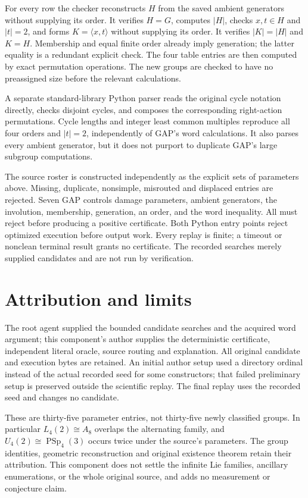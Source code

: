\documentclass[10pt,a4paper]{article}
\begin{document}
For every row the checker reconstructs $H$ from the saved ambient
generators without supplying its order. It verifies $H=G$, computes
$|H|$, checks $x,t\in H$ and $|t|=2$, and forms $K=\langle x,t\rangle$
without supplying its order. It verifies $|K|=|H|$ and $K=H$.
Membership and equal finite order already imply generation; the latter
equality is a redundant explicit check. The four table entries are then
computed by exact permutation operations. The new groups are checked to
have no preassigned size before the relevant calculations.

A separate standard-library Python parser reads the original cycle
notation directly, checks disjoint cycles, and composes the corresponding
right-action permutations. Cycle lengths and integer least common
multiples reproduce all four orders and $|t|=2$, independently of GAP's
word calculations. It also parses every ambient generator, but it does
not purport to duplicate GAP's large subgroup computations.

The source roster is constructed independently as the explicit sets of
parameters above. Missing, duplicate, nonsimple, misrouted and displaced
entries are rejected. Seven GAP controls damage parameters, ambient
generators, the involution, membership, generation, an order, and the
word inequality. All must reject before producing a positive certificate.
Both Python entry points reject optimized execution before output work.
Every replay is finite; a timeout or nonclean terminal result grants no
certificate. The recorded searches merely supplied candidates and are
not run by verification.

\section{Attribution and limits}
The root agent supplied the bounded candidate searches and the acquired
word argument; this component's author supplies the deterministic
certificate, independent literal oracle, source routing and explanation.
All original candidate and execution bytes are retained. An initial
author setup used a directory ordinal instead of the actual recorded
seed for some constructors; that failed preliminary setup is preserved
outside the scientific replay. The final replay uses the recorded seed
and changes no candidate.

These are thirty-five parameter entries, not thirty-five newly classified
groups. In particular $L_4(2)\cong A_8$ overlaps the alternating family,
and $U_4(2)\cong\operatorname{PSp}_4(3)$ occurs twice under the source's
parameters. The group identities, geometric reconstruction and original
existence theorem retain their attribution. This component does not
settle the infinite Lie families, ancillary enumerations, or the whole
original source, and adds no measurement or conjecture claim.
\newpage
\end{document}

